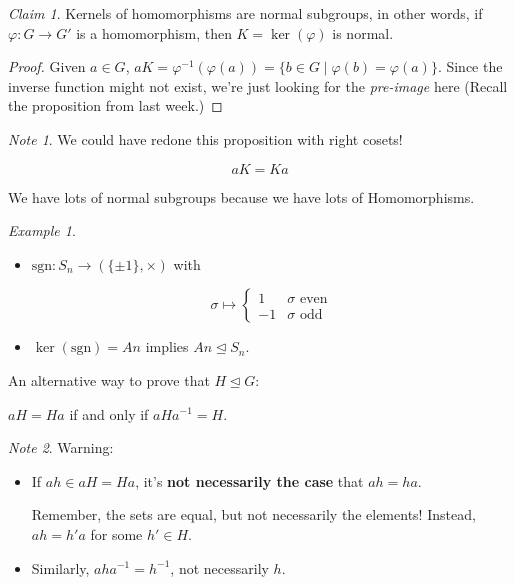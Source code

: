 \documentclass[12pt]{article}
\def\sgn{\text{sgn}}
\def\phi{\varphi}
\def\sgn{\text{sgn}}
\theoremstyle{remark}
\theoremstyle{remark}
\newtheorem{claim}{Claim}
\theoremstyle{remark}
\newtheorem{example}{Example}
\theoremstyle{remark}
\theoremstyle{remark}
\newtheorem*{note}{Note}
\begin{document}
\begin{claim}
  Kernels of homomorphisms are normal subgroups, in other words, if $\phi: G \to
  G'$ is a homomorphism, then $K = \ker(\phi)$ is normal.
\end{claim}

\begin{proof}
  Given $a \in G$, $aK = \phi^{-1}(\phi(a)) = \{b \in G \mid \phi(b) =
  \phi(a)\}$. Since the inverse function might not exist, we're just looking for
  the {\it pre-image} here (Recall the proposition from last week.)
\end{proof}

\begin{note}
  We could have redone this proposition with right cosets!

  \[
    aK = Ka
  \]
\end{note}

We have lots of normal subgroups because we have lots of Homomorphisms.

\begin{example}
  \begin{itemize}
    \item $\sgn : S_n \to (\{\pm 1\}, \times)$ with

      \[
        \sigma \mapsto \begin{cases}
          1 & \sigma \text{ even} \\
          -1 & \sigma \text{ odd}
        \end{cases}
      \]

    \item $\ker(\sgn) = An$ implies $An \trianglelefteq S_n$.
  \end{itemize}
\end{example}

An alternative way to prove that $H \trianglelefteq G$:

$aH = Ha$ if and only if $aHa^{-1} = H$.

\begin{note}
  Warning:

  \begin{itemize}
    \item If $ah \in aH = Ha$, it's {\bf not necessarily the case} that $ah = ha$.

      Remember, the sets are equal, but not necessarily the elements! Instead, $ah =
      h'a$ for some $h' \in H$.

    \item Similarly, $aha^{-1} = h^{-1}$, not necessarily $h$.
  \end{itemize}
\end{note}
\end{document}
